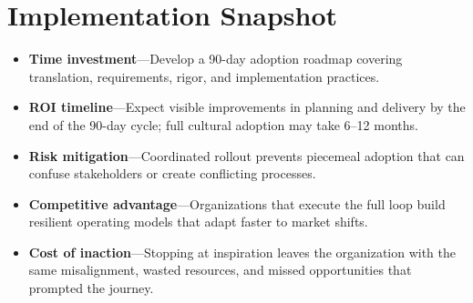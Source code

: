 \section{Implementation Snapshot}
\label{sec:conclusion-snapshot}
\begin{itemize}
    \item \textbf{Time investment}—Develop a 90-day adoption roadmap covering translation, requirements, rigor, and implementation practices.
    \item \textbf{ROI timeline}—Expect visible improvements in planning and delivery by the end of the 90-day cycle; full cultural adoption may take 6--12 months.
    \item \textbf{Risk mitigation}—Coordinated rollout prevents piecemeal adoption that can confuse stakeholders or create conflicting processes.
    \item \textbf{Competitive advantage}—Organizations that execute the full loop build resilient operating models that adapt faster to market shifts.
    \item \textbf{Cost of inaction}—Stopping at inspiration leaves the organization with the same misalignment, wasted resources, and missed opportunities that prompted the journey.
\end{itemize}
